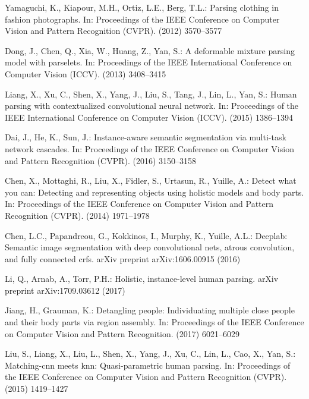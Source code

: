 \documentclass[10pt, letterpaper]{article}
\begin{document}
\begin{thebibliography}{10}
Yamaguchi, K., Kiapour, M.H., Ortiz, L.E., Berg, T.L.:
\newblock Parsing clothing in fashion photographs.
\newblock In: Proceedings of the IEEE Conference on Computer Vision and Pattern
  Recognition (CVPR). (2012)  3570--3577

Dong, J., Chen, Q., Xia, W., Huang, Z., Yan, S.:
\newblock A deformable mixture parsing model with parselets.
\newblock In: Proceedings of the IEEE International Conference on Computer
  Vision (ICCV). (2013)  3408--3415

Liang, X., Xu, C., Shen, X., Yang, J., Liu, S., Tang, J., Lin, L., Yan, S.:
\newblock Human parsing with contextualized convolutional neural network.
\newblock In: Proceedings of the IEEE International Conference on Computer
  Vision (ICCV). (2015)  1386--1394

Dai, J., He, K., Sun, J.:
\newblock Instance-aware semantic segmentation via multi-task network cascades.
\newblock In: Proceedings of the IEEE Conference on Computer Vision and Pattern
  Recognition (CVPR). (2016)  3150--3158

Chen, X., Mottaghi, R., Liu, X., Fidler, S., Urtasun, R., Yuille, A.:
\newblock Detect what you can: Detecting and representing objects using
  holistic models and body parts.
\newblock In: Proceedings of the IEEE Conference on Computer Vision and Pattern
  Recognition (CVPR). (2014)  1971--1978

Chen, L.C., Papandreou, G., Kokkinos, I., Murphy, K., Yuille, A.L.:
\newblock Deeplab: Semantic image segmentation with deep convolutional nets,
  atrous convolution, and fully connected crfs.
\newblock arXiv preprint arXiv:1606.00915 (2016)

Li, Q., Arnab, A., Torr, P.H.:
\newblock Holistic, instance-level human parsing.
\newblock arXiv preprint arXiv:1709.03612 (2017)

Jiang, H., Grauman, K.:
\newblock Detangling people: Individuating multiple close people and their body
  parts via region assembly.
\newblock In: Proceedings of the IEEE Conference on Computer Vision and Pattern
  Recognition. (2017)  6021--6029

Liu, S., Liang, X., Liu, L., Shen, X., Yang, J., Xu, C., Lin, L., Cao, X., Yan,
  S.:
\newblock Matching-cnn meets knn: Quasi-parametric human parsing.
\newblock In: Proceedings of the IEEE Conference on Computer Vision and Pattern
  Recognition (CVPR). (2015)  1419--1427


\end{thebibliography}
\end{document}
